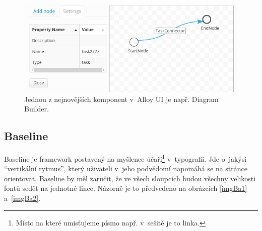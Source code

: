 \documentclass[thesis=B,czech]{FITthesis}[2012/06/26]
\begin{document}
\begin{figure}[h]
	\begin{center}
	\includegraphics[scale=0.7]{images/image13.png}
	\end{center}
	\caption[Alloy UI komponenta]{Jednou z nejnovějších komponent v~Alloy UI je např. Diagram Builder.}
	\label{imgAlloy}
\end{figure}

\newpage
\subsection{Baseline}

Baseline je framework postavený na myšlence účaří\footnote{Místo na které umisťujeme písmo např. v~sešitě je to linka.} v~typografii. Jde o~jakýsi “vertikální rytmus”, který uživateli v~jeho podvědomí napomáhá se na stránce orientovat. Baseline by měl zaručit, že ve všech sloupcích budou všechny velikosti fontů sedět na jednotné lince. Názorně je to předvedeno na obrázcích \ref{imgBa1} a~\ref{imgBa2}. 
\end{document}

